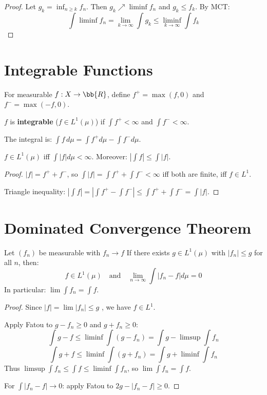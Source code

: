 \begin{proof}
Let $g_k = \inf_{n \geq k} f_n$. Then $g_k \nearrow \liminf f_n$ and $g_k \leq f_k$. By MCT:
\[ \int \liminf f_n = \lim_{k \to \infty} \int g_k \leq \liminf_{k \to \infty} \int f_k \]
\end{proof}

\section{Integrable Functions}

\begin{definition}
For measurable $f: X \to \bb{R}$, define $f^+ = \max(f, 0)$ and $f^- = \max(-f, 0)$.

$f$ is \textbf{integrable} ($f \in L^1(\mu)$) if $\int f^+ < \infty$ and $\int f^- < \infty$.

The integral is: $\int f \, d\mu = \int f^+ d\mu - \int f^- d\mu$.
\end{definition}

\begin{proposition}
$f \in L^1(\mu)$ iff $\int |f| d\mu < \infty$. Moreover: $\left|\int f\right| \leq \int |f|$.
\end{proposition}

\begin{proof}
$|f| = f^+ + f^-$, so $\int |f| = \int f^+ + \int f^- < \infty$ iff both are finite, iff $f \in L^1$.

Triangle inequality: $|\int f| = |\int f^+ - \int f^-| \leq \int f^+ + \int f^- = \int |f|$.
\end{proof}

\section{Dominated Convergence Theorem}

\begin{theorem}
Let $(f_n)$ be measurable with $f_n \to f$ \almosteverywhere{} If there exists $g \in L^1(\mu)$ with $|f_n| \leq g$ \almosteverywhere{} for all $n$, then:
\[ f \in L^1(\mu) \quad \text{and} \quad \lim_{n \to \infty} \int |f_n - f| d\mu = 0 \]
In particular: $\lim \int f_n = \int f$.
\end{theorem}

\begin{proof}
Since $|f| = \lim |f_n| \leq g$ \almosteverywhere{}, we have $f \in L^1$.

Apply Fatou to $g - f_n \geq 0$ and $g + f_n \geq 0$:
\[ \int g - f \leq \liminf \int (g - f_n) = \int g - \limsup \int f_n \]
\[ \int g + f \leq \liminf \int (g + f_n) = \int g + \liminf \int f_n \]
Thus $\limsup \int f_n \leq \int f \leq \liminf \int f_n$, so $\lim \int f_n = \int f$.

For $\int |f_n - f| \to 0$: apply Fatou to $2g - |f_n - f| \geq 0$.
\end{proof}

